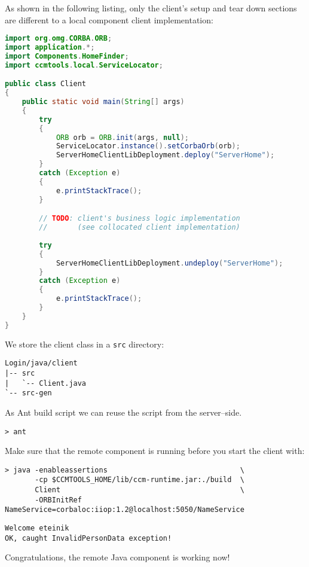 \vspace{3mm}
As shown in the following listing, only the client's setup and tear down
sections are different to a local component client implementation:
\begin{footnotesize}
\begin{lstlisting}[language=Java]
import org.omg.CORBA.ORB;
import application.*;
import Components.HomeFinder;
import ccmtools.local.ServiceLocator;

public class Client
{
    public static void main(String[] args)
    {
        try
        {
            ORB orb = ORB.init(args, null);
            ServiceLocator.instance().setCorbaOrb(orb);
            ServerHomeClientLibDeployment.deploy("ServerHome");
        }
        catch (Exception e)
        {
            e.printStackTrace();
        }

        // TODO: client's business logic implementation 
        //       (see collocated client implementation)
        
        try
        {
            ServerHomeClientLibDeployment.undeploy("ServerHome");
        }
        catch (Exception e)
        {
            e.printStackTrace();
        }
    }
}
\end{lstlisting}
\end{footnotesize}

We store the client class in a {\tt src} directory:
\begin{footnotesize}
\begin{verbatim}
Login/java/client
|-- src
|   `-- Client.java
`-- src-gen
\end{verbatim}
\end{footnotesize}

As Ant build script we can reuse the script from the server--side.
\begin{footnotesize}
\begin{verbatim}
> ant
\end{verbatim}
\end{footnotesize}

Make sure that the remote component is running before you start the client with:
\begin{footnotesize}
\begin{verbatim}
> java -enableassertions                               \
       -cp $CCMTOOLS_HOME/lib/ccm-runtime.jar:./build  \
       Client                                          \
       -ORBInitRef NameService=corbaloc:iiop:1.2@localhost:5050/NameService
\end{verbatim}
\end{footnotesize}

\begin{footnotesize}
\begin{verbatim}
Welcome eteinik
OK, caught InvalidPersonData exception!
\end{verbatim}
\end{footnotesize}
Congratulations, the remote Java component is working now!

\newpage
